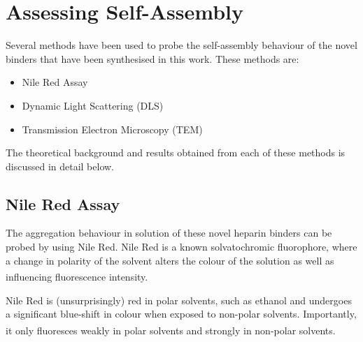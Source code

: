 \section{Assessing Self-Assembly}
Several methods have been used to probe the self-assembly behaviour of the novel binders that have been synthesised in this work. These methods are:
\begin{itemize}
\item Nile Red Assay
\item Dynamic Light Scattering (DLS)
\item Transmission Electron Microscopy (TEM)
\end{itemize}
The theoretical background and results obtained from each of these methods is discussed in detail below.

\subsection{Nile Red Assay}
The aggregation behaviour in solution of these novel heparin binders can be probed by using Nile Red.  Nile Red is a known solvatochromic fluorophore, where a change in polarity of the solvent alters the colour of the solution as well as influencing fluorescence intensity.\textsuperscript{\cite{NileRed-ThermoFisherScientificHttps://www.thermofisher.com/order/catalog/product/N1142}}

Nile Red is (unsurprisingly) red in polar solvents, such as ethanol and undergoes a significant blue-shift in colour when exposed to non-polar solvents. Importantly, it only fluoresces weakly in polar solvents and strongly in non-polar solvents.\textsuperscript{\cite{NileRed-ThermoFisherScientificHttps://www.thermofisher.com/order/catalog/product/N1142}}

